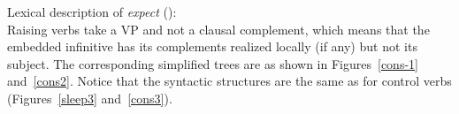 \eas
Lexical description of \emph{expect} ():\\
\zs
Raising verbs take a VP and not a clausal complement, which means that the embedded infinitive has its complements realized locally (if any) but not its subject. The  corresponding simplified trees are as
shown in Figures~\ref{cons-1} and~\ref{cons2}. Notice that the syntactic structures are the same as for control verbs (Figures~\ref{sleep3} and~\ref{cons3}). 
